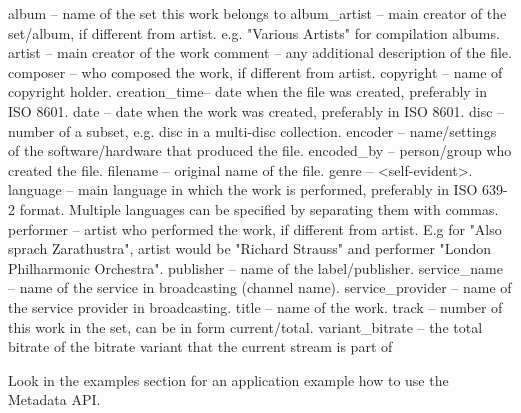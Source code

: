 \begin{DoxyVerb}album        -- name of the set this work belongs to
album_artist -- main creator of the set/album, if different from artist.
                e.g. "Various Artists" for compilation albums.
artist       -- main creator of the work
comment      -- any additional description of the file.
composer     -- who composed the work, if different from artist.
copyright    -- name of copyright holder.
creation_time-- date when the file was created, preferably in ISO 8601.
date         -- date when the work was created, preferably in ISO 8601.
disc         -- number of a subset, e.g. disc in a multi-disc collection.
encoder      -- name/settings of the software/hardware that produced the file.
encoded_by   -- person/group who created the file.
filename     -- original name of the file.
genre        -- <self-evident>.
language     -- main language in which the work is performed, preferably
                in ISO 639-2 format. Multiple languages can be specified by
                separating them with commas.
performer    -- artist who performed the work, if different from artist.
                E.g for "Also sprach Zarathustra", artist would be "Richard
                Strauss" and performer "London Philharmonic Orchestra".
publisher    -- name of the label/publisher.
service_name     -- name of the service in broadcasting (channel name).
service_provider -- name of the service provider in broadcasting.
title        -- name of the work.
track        -- number of this work in the set, can be in form current/total.
variant_bitrate -- the total bitrate of the bitrate variant that the current stream is part of
\end{DoxyVerb}


Look in the examples section for an application example how to use the Metadata A\+PI. 